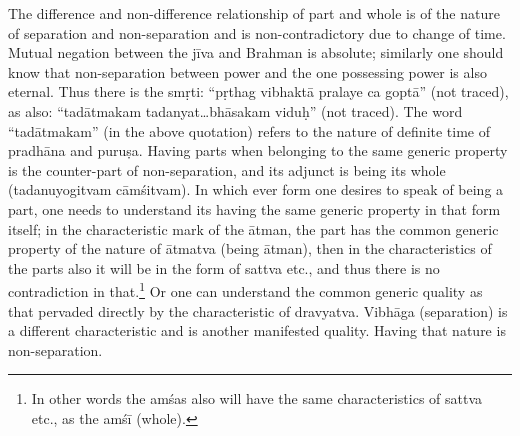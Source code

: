 

The difference and non-difference relationship of part and whole is of the nature of separation and non-separation and is non-contradictory due to change of time. Mutual negation between the jīva and Brahman is absolute; similarly one should know that non-separation between power and the one possessing power is also eternal. Thus there is the smṛti: “pṛthag vibhaktā pralaye ca goptā” (not traced), as also: “tadātmakam tadanyat…bhāsakam viduḥ” (not traced). The word “tadātmakam” (in the above quotation) refers to the nature of definite time of pradhāna and puruṣa. Having parts when belonging to the same generic property is the counter-part of non-separation, and its adjunct is being its whole (tadanuyogitvam cāmśitvam). In which ever form one desires to speak of being a part, one needs to understand its having the same generic property in that form itself; in the  characteristic mark of the ātman, the part has the common generic property of the nature of ātmatva (being ātman), then in the characteristics of the parts also it will be in the form of sattva etc., and thus there is no contradiction in that.\footnote{In other words the amśas also will have the same characteristics of sattva etc., as the amśī (whole).} Or one can understand the common generic quality as that pervaded directly by the characteristic of dravyatva. Vibhāga (separation) is a different characteristic and is another manifested quality. Having that nature is non-separation. 

